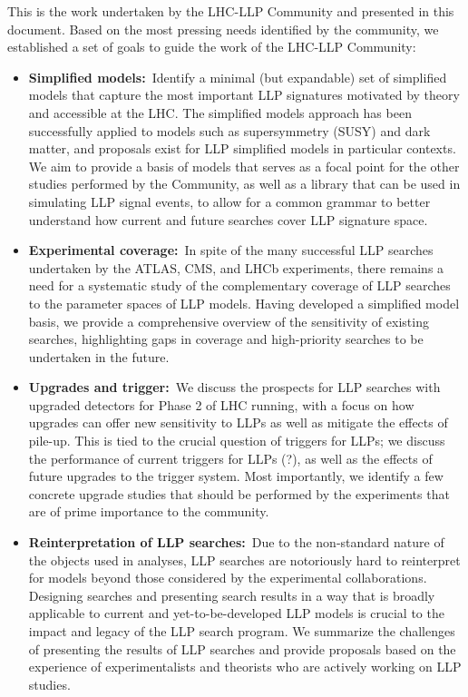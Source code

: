 This is the work undertaken by the LHC-LLP Community and presented in this document. Based on the most pressing needs identified by the community, we established a set of goals to guide the work of the LHC-LLP Community:
%
\begin{itemize}

\item {\bf Simplified models:}~Identify a minimal (but expandable) set of simplified models that capture the most important LLP signatures motivated by theory and accessible at the LHC. The simplified models approach has been successfully applied to models such as supersymmetry (SUSY) and dark matter, and proposals exist for LLP simplified models in particular contexts. We aim to provide a basis of models that serves as a focal point for the other studies performed by the Community, as well as a library that can be used in simulating LLP signal events, to allow for a common grammar to better understand how current and future searches cover LLP signature space.

\item {\bf Experimental coverage:}~In spite of the many successful LLP searches undertaken by the ATLAS, CMS, and LHCb experiments, there remains a need for a systematic study of the complementary coverage of LLP searches to the parameter spaces of LLP models. Having developed a simplified model basis, we provide a comprehensive overview of the sensitivity of existing searches, highlighting gaps in coverage and high-priority searches to be undertaken in the future.

\item {\bf Upgrades and trigger:}~We discuss the prospects for LLP searches with upgraded detectors for Phase 2 of LHC running, with a focus on how upgrades can offer new sensitivity to LLPs as well as mitigate the effects of pile-up. This is tied to the crucial question of triggers for LLPs; we discuss the performance of current triggers for LLPs (?), as well as the effects of future upgrades to the trigger system. Most importantly, we identify a few concrete upgrade studies that should be performed by the experiments that are of prime importance to the community.

\item {\bf Reinterpretation of LLP searches:}~Due to the non-standard nature of the objects used in analyses, LLP searches are notoriously hard to reinterpret for models beyond those considered by the experimental collaborations. Designing searches and presenting search results in a way that is broadly applicable to current and yet-to-be-developed LLP models is crucial to the impact and legacy of the LLP search program. We summarize the challenges of presenting the results of LLP searches and provide proposals based on the experience of experimentalists and theorists who are actively working on LLP studies.


\end{itemize}
